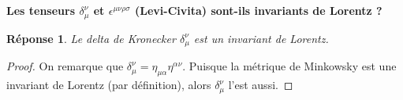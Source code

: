 \documentclass{article}
\numberwithin{equation}{section}
\theoremstyle{solution}
\newtheorem{solution}{Réponse}[section]
\begin{document}
\subsection{}
\textbf{Les tenseurs $\delta_{\mu}^{\nu}$ et  $\epsilon^{\mu\nu\rho\sigma}$ (Levi-Civita) sont-ils invariants de Lorentz ?}
\vspace{2ex}
\begin{solution}
        Le delta de Kronecker $\delta_\mu^{\nu}$ est un invariant de Lorentz.
\end{solution}
\begin{proof}
On remarque que $\delta^{\nu}_{\mu} = \eta_{\mu \alpha} \eta^{\alpha\nu}$. Puisque la métrique de Minkowsky est une invariant de 
Lorentz (par définition), alors $\delta^{\nu}_{\mu}$ l'est aussi.
\end{proof}
        
\end{document}
